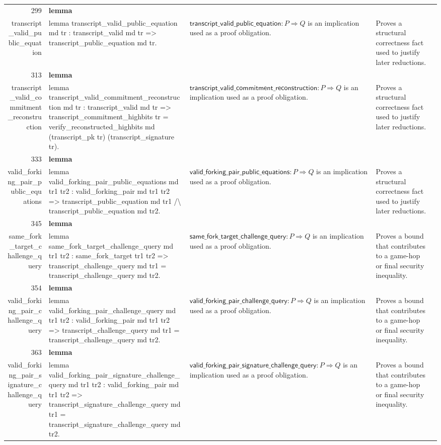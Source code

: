 \documentclass[10pt]{article}
\newcommand{\ec}[1]{\begingroup\ttfamily\scriptsize #1\endgroup}
\begin{document}
\begin{longtable}{r L{0.17\textwidth} L{0.26\textwidth} L{0.27\textwidth} L{0.20\textwidth}}
299 & \textbf{lemma}\\\ec{transcript\_valid\_public\_equation} & \ec{lemma transcript\_valid\_public\_equation md tr : transcript\_valid md tr => transcript\_public\_equation md tr.} & \(\mathsf{transcript\_valid\_public\_equation} : P \Rightarrow Q\) is an implication used as a proof obligation. & Proves a structural correctness fact used to justify later reductions. \\
313 & \textbf{lemma}\\\ec{transcript\_valid\_commitment\_reconstruction} & \ec{lemma transcript\_valid\_commitment\_reconstruction md tr : transcript\_valid md tr => transcript\_commitment\_highbits tr = verify\_reconstructed\_highbits md (transcript\_pk tr) (transcript\_signature tr).} & \(\mathsf{transcript\_valid\_commitment\_reconstruction} : P \Rightarrow Q\) is an implication used as a proof obligation. & Proves a structural correctness fact used to justify later reductions. \\
333 & \textbf{lemma}\\\ec{valid\_forking\_pair\_public\_equations} & \ec{lemma valid\_forking\_pair\_public\_equations md tr1 tr2 : valid\_forking\_pair md tr1 tr2 => transcript\_public\_equation md tr1 /\textbackslash{} transcript\_public\_equation md tr2.} & \(\mathsf{valid\_forking\_pair\_public\_equations} : P \Rightarrow Q\) is an implication used as a proof obligation. & Proves a structural correctness fact used to justify later reductions. \\
345 & \textbf{lemma}\\\ec{same\_fork\_target\_challenge\_query} & \ec{lemma same\_fork\_target\_challenge\_query md tr1 tr2 : same\_fork\_target tr1 tr2 => transcript\_challenge\_query md tr1 = transcript\_challenge\_query md tr2.} & \(\mathsf{same\_fork\_target\_challenge\_query} : P \Rightarrow Q\) is an implication used as a proof obligation. & Proves a bound that contributes to a game-hop or final security inequality. \\
354 & \textbf{lemma}\\\ec{valid\_forking\_pair\_challenge\_query} & \ec{lemma valid\_forking\_pair\_challenge\_query md tr1 tr2 : valid\_forking\_pair md tr1 tr2 => transcript\_challenge\_query md tr1 = transcript\_challenge\_query md tr2.} & \(\mathsf{valid\_forking\_pair\_challenge\_query} : P \Rightarrow Q\) is an implication used as a proof obligation. & Proves a bound that contributes to a game-hop or final security inequality. \\
363 & \textbf{lemma}\\\ec{valid\_forking\_pair\_signature\_challenge\_query} & \ec{lemma valid\_forking\_pair\_signature\_challenge\_query md tr1 tr2 : valid\_forking\_pair md tr1 tr2 => transcript\_signature\_challenge\_query md tr1 = transcript\_signature\_challenge\_query md tr2.} & \(\mathsf{valid\_forking\_pair\_signature\_challenge\_query} : P \Rightarrow Q\) is an implication used as a proof obligation. & Proves a bound that contributes to a game-hop or final security inequality. \\

\end{longtable}
\end{document}
